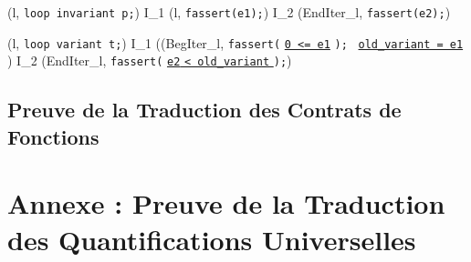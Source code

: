 {\scriptsize
  {
    {
      (l, \mbox{\lstinline'loop invariant p;'}) 
      I_1 \concat (l, \mbox{\lstinline'fassert(e1);'})
      \concat I_2 \concat (EndIter_l, \mbox{\lstinline'fassert(e2);'})
    }
  }
}

{\scriptsize
  {
    {
      \splitfrac
          {
            (l, \mbox{\lstinline'loop variant t;'}) 
          }
          {
            I_1 \concat ((BegIter_l,
            \mbox{\lstinline'fassert('}
            \underline{\mbox{\lstinline'0 <= e1'}}
            \mbox{\lstinline');' }
            \underline{\Zinit \mbox{\lstinline'old_variant = e1'} \Zclear}
            \semicolon)
            \concat I_2
            \concat(EndIter_l,
            \mbox{\lstinline'fassert('}
            \underline{\mbox{\lstinline'e2'}\Zclear
              \mbox{\lstinline'< old_variant'} \Zclear}
            \mbox{\lstinline');'})
          }
    }
  }
}



\subsection{Preuve de la Traduction des Contrats de Fonctions}















\newpage
{}
\section{Annexe : Preuve de la Traduction des Quantifications Universelles}

